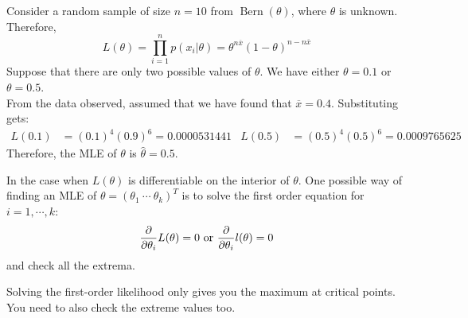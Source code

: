 \documentclass{huhtakm-template-book-v2}
\DeclareMathOperator{\Bern}{Bern}
\begin{document}
\begin{eg}
	Consider a random sample of size $n=10$ from $\Bern(\theta)$, where $\theta$ is unknown. Therefore,
	\begin{equation*}
		L(\theta)=\prod_{i=1}^{n}p(x_{i}|\theta)=\theta^{n\overline{x}}(1-\theta)^{n-n\overline{x}}
	\end{equation*}
	Suppose that there are only two possible values of $\theta$. We have either $\theta=0.1$ or $\theta=0.5$.\\
	From the data observed, assumed that we have found that $\overline{x}=0.4$. Substituting gets:
	\begin{align*}
		L(0.1)&=(0.1)^{4}(0.9)^{6}=0.0000531441 & L(0.5)&=(0.5)^{4}(0.5)^{6}=0.0009765625
	\end{align*}
	Therefore, the MLE of $\theta$ is $\hat{\theta}=0.5$.
\end{eg}
\begin{eg}
	In the case when $L(\theta)$ is differentiable on the interior of $\theta$. One possible way of finding an MLE of $\theta=(\theta_{1}\ \cdots\ \theta_{k})^{T}$ is to solve the first order equation for $i=1,\cdots,k$:
	\begin{equation*}
		\pdv*{L(\theta)}{\theta_{i}}=0\text{ or }\pdv*{l(\theta)}{\theta_{i}}=0
	\end{equation*}
	and check all the extrema.
\end{eg}
\begin{rem}
	Solving the first-order likelihood only gives you the maximum at critical points. You need to also check the extreme values too.
\end{rem}
\end{document}
